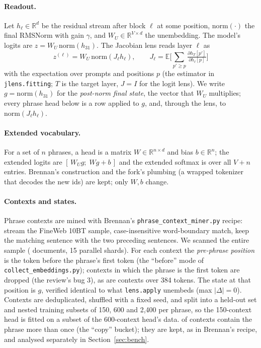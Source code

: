 \documentclass[11pt]{article}
\newcommand{\WU}{W_U}
\begin{document}
\paragraph{Readout.}
Let $h_\ell\in\mathbb{R}^d$ be the residual stream after block $\ell$ at some position, $\mathrm{norm}(\cdot)$ the final RMSNorm with gain $\gamma$, and $\WU\in\mathbb{R}^{V\times d}$ the unembedding. The model's logits are $z=\WU\,\mathrm{norm}(h_{31})$. The Jacobian lens \cite{gurnee2026workspace} reads layer $\ell$ as
\begin{equation}
  z^{(\ell)} = \WU\,\mathrm{norm}(J_\ell h_\ell),
  \qquad J_\ell = \mathbb{E}\Big[\sum_{p'\ge p}\tfrac{\partial h_{T}[p']}{\partial h_\ell[p]}\Big]
  \label{eq:jlens}
\end{equation}
with the expectation over prompts and positions $p$ (the estimator in \texttt{jlens.fitting}; $T$ is the target layer, $J=I$ for the logit lens). We write $g=\mathrm{norm}(h_{31})$ for the \emph{post-norm final state}, the vector that $\WU$ multiplies; every phrase head below is a row applied to $g$, and, through the lens, to $\mathrm{norm}(J_\ell h_\ell)$.

\paragraph{Extended vocabulary.}
For a set of $n$ phrases, a head is a matrix $W\in\mathbb{R}^{n\times d}$ and bias $b\in\mathbb{R}^n$; the extended logits are $[\,\WU g;\; Wg+b\,]$ and the extended softmax is over all $V+n$ entries. Brennan's construction and the fork's plumbing (a wrapped tokenizer that decodes the new ids) are kept; only $W,b$ change.

\paragraph{Contexts and states.}
Phrase contexts are mined with Brennan's \texttt{phrase\_context\_miner.py} recipe: stream the FineWeb 10BT sample, case-insensitive word-boundary match, keep the matching sentence with the two preceding sentences. We scanned the entire sample (\EoneDocs{} documents, 15 parallel shards). For each context the \emph{pre-phrase position} is the token before the phrase's first token (the ``before'' mode of \texttt{collect\_embeddings.py}); contexts in which the phrase is the first token are dropped (the review's bug 3), as are contexts over 384 tokens. The state at that position is $g$, verified identical to what \texttt{lens.apply} unembeds (max $|\Delta|=0$). Contexts are deduplicated, shuffled with a fixed seed, and split into a held-out set and nested training subsets of 150, 600 and 2{,}400 per phrase, so the 150-context head is fitted on a subset of the 600-context head's data. \EoneCopyFrac{} of contexts contain the phrase more than once (the ``copy'' bucket); they are kept, as in Brennan's recipe, and analysed separately in Section~\ref{sec:bench}.
\end{document}
